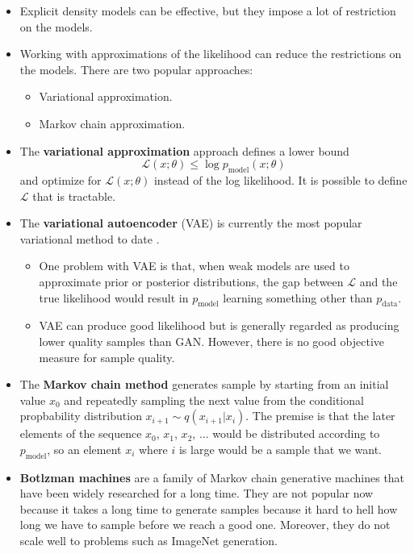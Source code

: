 \documentclass[10pt]{article}
\begin{document}
\begin{itemize}
	\item Explicit density models can be effective, but they impose a lot of restriction on the models.

	\item Working with approximations of the likelihood can reduce the restrictions on the models. There are two popular approaches:
	\begin{itemize}
	  \item Variational approximation.
	  \item Markov chain approximation.
	\end{itemize}

  \item The \textbf{variational approximation} approach defines a lower bound $$\mathcal{L}(x;\theta) \leq \log p_{\mathrm{model}}(x;\theta)$$
  and optimize for $\mathcal{L}(x;\theta)$ instead of the log likelihood. It is possible to define $\mathcal{L}$ that is tractable.

  \item The \textbf{variational autoencoder} (VAE) is currently the most popular variational method to date \cite{Kingma:2013}.

  \begin{itemize}
    \item One problem with VAE is that, when weak models are used to approximate prior or posterior distributions, the gap between $\mathcal{L}$ and the true likelihood would result in $p_{\mathrm{model}}$ learning something other than $p_{\mathrm{data}}$.

    \item VAE can produce good likelihood but is generally regarded as producing lower quality samples than GAN. However, there is no good objective measure for sample quality.
  \end{itemize}

  \item The \textbf{Markov chain method} generates sample by starting from an initial value $x_0$ and repeatedly sampling the next value from the conditional propbability distribution $x_{i+1} \sim q(x_{i+1}|x_i)$. The premise is that the later elements of the sequence $x_0$, $x_1$, $x_2$, $\dotsc$ would be distributed according to $p_{\mathrm{model}}$, so an element $x_i$ where $i$ is large would be a sample that we want.

  \item \textbf{Botlzman machines} are a family of Markov chain generative machines that have been widely researched for a long time. They are not popular now because it takes a long time to generate samples because it hard to hell how long we have to sample before we reach a good one. Moreover, they do not scale well to problems such as ImageNet generation.

  \end{itemize}
\end{document}
